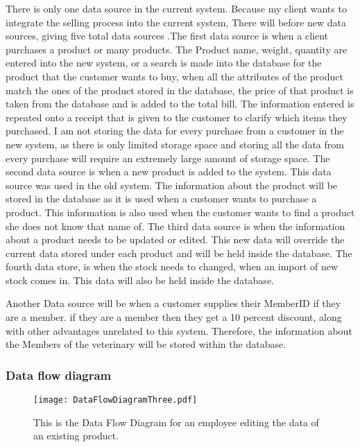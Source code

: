 There is only one data source in the current system. Because my client wants to integrate the selling process into the current system, There will before new data sources, giving five total data sources .The first data source is when a client purchases a product or many products. The Product name, weight, quantity are entered into the new system, or a search is made into the database for the product that the customer wants to buy, when all the attributes of the product match the ones of the product stored in the database, the price of that product is taken from the database and is added to the total bill. The information entered is repeated onto a receipt that is given to the customer to clarify which items they purchased. I am not storing the data for every purchase from a customer in the new system, as there is only limited storage space and storing all the data from every purchase will require an extremely large amount of storage space. The second data source is when a new product is added to the system. This data source was used in the old system. The information about the product will be stored in the database as it is used when a customer wants to purchase a product. This information is also used when the customer wants to find a product she does not know that name of. The third data source is when the information about a product needs to be updated or edited. This new data will override the current data stored under each product and will be held inside the database. The fourth data store, is when the stock needs to changed, when an import of new stock comes in. This data will also be held inside the database.\par 
Another Data source will be when a customer supplies their MemberID if they are a member. if they are a member then they get a 10 percent discount, along with other advantages unrelated to this system. Therefore, the information about the Members of the veterinary will be stored within the database.


\subsubsection{Data flow diagram}


\begin{figure}[H]
\texttt{[image: DataFlowDiagramThree.pdf]}
\caption{This is the Data Flow Diagram for an employee editing the data of an existing product.} \label{fig:DataFlowDiagram3}
\end{figure}

